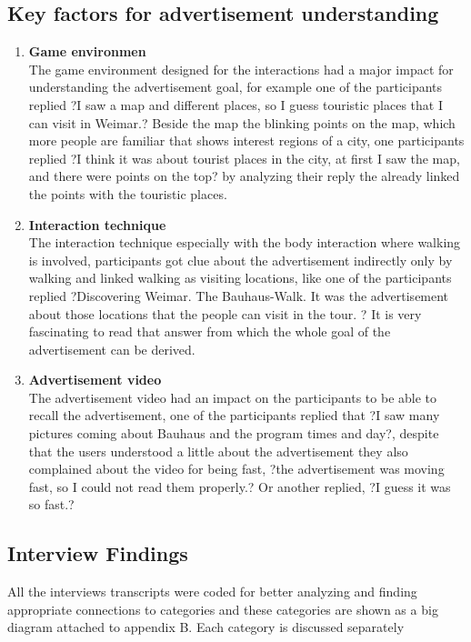 \subsection{Key factors for advertisement understanding}
\begin{enumerate}
\item	\textbf{Game environmen} \\
The game environment designed for the interactions had a major impact for understanding the advertisement goal, for example one of the participants replied ?I saw a map and different places, so I guess touristic places that I can visit in Weimar.?   Beside the map the blinking points on the map, which more people are familiar that shows interest regions of a city, one participants replied ?I think it was about tourist places in the city, at first I saw the map, and there were points on the top? by analyzing their reply the already linked the points with the touristic places.

\item	\textbf{Interaction technique} \\
The interaction technique especially with the body interaction where walking is involved, participants got clue about the advertisement indirectly only by walking and linked walking as visiting locations, like one of the participants replied ?Discovering Weimar. The Bauhaus-Walk. It was the advertisement about those locations that the people can visit in the tour. ? It is very fascinating to read that answer from which the whole goal of the advertisement can be derived. 

\item	\textbf{Advertisement video} \\
The advertisement video had an impact on the participants to be able to recall the advertisement, one of the participants replied that ?I saw many pictures coming about Bauhaus and the program times and day?, despite that the users understood a little about the advertisement they also complained about the video for being fast, ?the advertisement was moving fast, so I could not read them properly.? Or another replied, ?I guess it was so fast.? 

\end{enumerate}


\subsection{Interview Findings}
All the interviews transcripts were coded for better analyzing and finding appropriate connections to categories and these categories are shown as a big diagram attached to appendix B. Each category is discussed separately 

